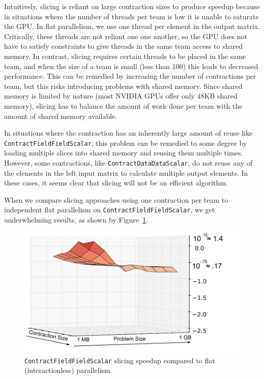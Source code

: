 Intuitively, slicing is reliant on large contraction sizes to produce speedup
because in situations where the number of threads per team is low it is unable
to saturate the GPU. In flat parallelism, we use one thread per element in the
output matrix. Critically, these threads are not reliant one one another, so the
GPU does not have to satisfy constraints to give threads in the same team access
to shared memory. In contrast, slicing requires certain threads to be placed in
the same team, and when the size of a team is small (less than 100) this leads
to decreased performance.  This can be remedied by increasing the number of
contractions per team, but this risks introducing problems with shared memory.
Since shared memory is limited by nature (most NVIDIA GPUs offer only 48KB
shared memory), slicing has to balance the amount of work done per team with the
amount of shared memory available.
    
In situations where the contraction has an inherently large amount of reuse like
\texttt{ContractFieldFieldScalar}, this problem can be remedied to some degree
by loading multiple slices into shared memory and reusing them multiple times.
However, some contractions, like \texttt{ContractDataDataScalar}, do not reuse
any of the elements in the left input matrix to calculate multiple output
elements. In these cases, it seems clear that slicing will not be an efficient
algorithm. 
	
When we compare slicing approaches using one contraction per team to independent
flat parallelism on \texttt{ContractFieldFieldScalar}, we get underwhelming
results, as shown by Figure~\ref{fig:CFFSSlicingVSIndepentent}. 

\begin{figure}[!ht] 
    \centering
    \includegraphics[width=5in]{CFFS_Slicing}
    \caption[\texttt{ContractFieldFieldScalar} speedup over
    flat parallel]{\texttt{ContractFieldFieldScalar} slicing speedup compared to
    flat (interactionless) parallelism}
\label{fig:CFFSSlicingVSIndepentent}
\end{figure}


